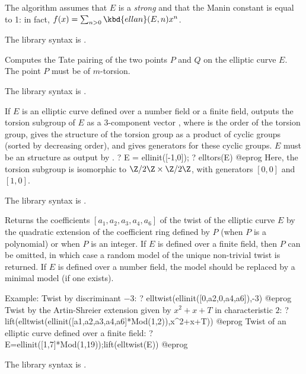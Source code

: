 The algorithm assumes that $E$ is a \emph{strong} 
and that the Manin constant is equal to 1: in fact, $f(x) = \sum_{n > 0}
\kbd{ellan}(E, n) x^n$.

The library syntax is .

\label{se:elltatepairing}
Computes the Tate pairing of the two points $P$ and $Q$ on the elliptic
curve $E$. The point $P$ must be of $m$-torsion.

The library syntax is .

\label{se:elltors}
If $E$ is an elliptic curve defined over a number field or a finite field,
outputs the torsion subgroup of $E$ as a 3-component vector \kbd{[t,v1,v2]},
where  is the order of the torsion group,  gives the structure
of the torsion group as a product of cyclic groups (sorted by decreasing
order), and  gives generators for these cyclic groups. $E$ must be an
 structure as output by .
\bprog
?  E = ellinit([-1,0]);
?  elltors(E)
@eprog\noindent
Here, the torsion subgroup is isomorphic to $\Z/2\Z \times \Z/2\Z$, with
generators $[0,0]$ and $[1,0]$.

The library syntax is .

\label{se:elltwist}
Returns the coefficients $[a_1,a_2,a_3,a_4,a_6]$ of the twist of the
elliptic curve $E$ by the quadratic extension of the coefficient ring
defined by $P$ (when $P$ is a polynomial) or  when $P$ is an
integer.  If $E$ is defined over a finite field, then $P$ can be omitted,
in which case a random model of the unique non-trivial twist is returned.
If $E$ is defined over a number field, the model should be replaced by a
minimal model (if one exists).

Example: Twist by discriminant $-3$:
\bprog
? elltwist(ellinit([0,a2,0,a4,a6]),-3)
@eprog
Twist by the Artin-Shreier extension given by $x^2+x+T$ in
characteristic $2$:
\bprog
? lift(elltwist(ellinit([a1,a2,a3,a4,a6]*Mod(1,2)),x^2+x+T))
@eprog
Twist of an elliptic curve defined over a finite field:
\bprog
? E=ellinit([1,7]*Mod(1,19));lift(elltwist(E))
@eprog

The library syntax is .

